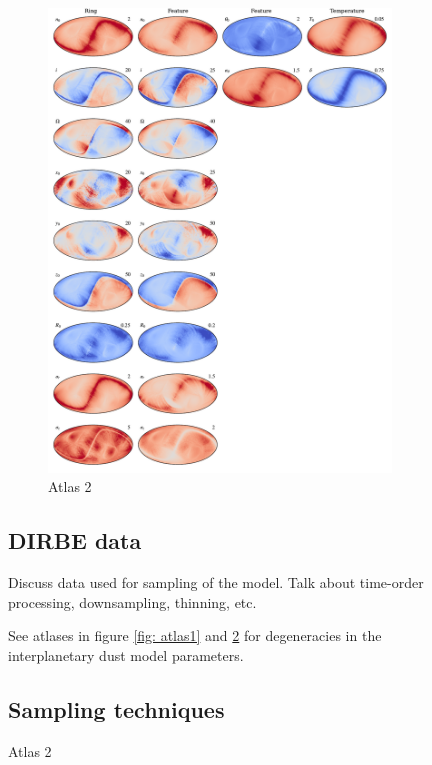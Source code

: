 \documentclass{aa}
\begin{document}
\begin{figure}
\begin{figure}
    \centering
         \includegraphics[width=0.8\linewidth]{figs/atlas_2_v2.pdf}
        \caption{Atlas 2}
      \label{fig: atlas2}
  \end{figure}


\subsection{DIRBE data}
Discuss data used for sampling of the model. Talk about time-order processing, downsampling, thinning, etc.

See atlases in figure \ref{fig: atlas1} and \ref{fig: atlas2} for degeneracies in the interplanetary dust model parameters.

\subsection{Sampling techniques}


\end{figure}
\end{document}

